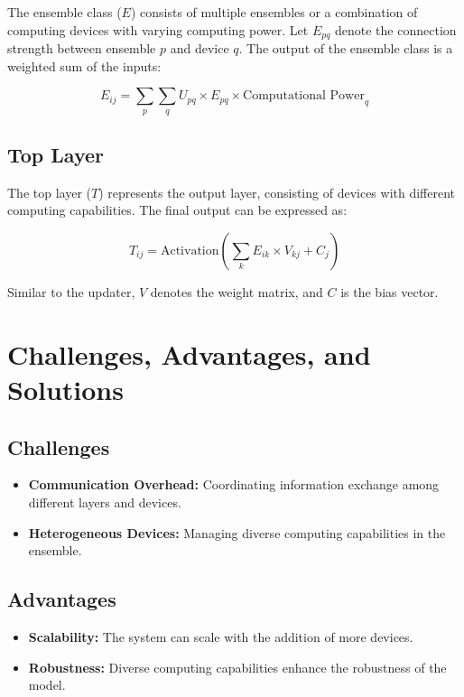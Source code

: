 \documentclass{article}
\begin{document}
The ensemble class ($E$) consists of multiple ensembles or a combination of computing devices with varying computing power. Let $E_{pq}$ denote the connection strength between ensemble $p$ and device $q$. The output of the ensemble class is a weighted sum of the inputs:

\[
E_{ij} = \sum_{p} \sum_{q} U_{pq} \times E_{pq} \times \text{Computational Power}_{q}
\]

\subsection{Top Layer}

The top layer ($T$) represents the output layer, consisting of devices with different computing capabilities. The final output can be expressed as:

\[
T_{ij} = \text{Activation}\left(\sum_{k} E_{ik} \times V_{kj} + C_j\right)
\]

Similar to the updater, $V$ denotes the weight matrix, and $C$ is the bias vector.

\section{Challenges, Advantages, and Solutions}

\subsection{Challenges}

\begin{itemize}
  \item \textbf{Communication Overhead:} Coordinating information exchange among different layers and devices.
  \item \textbf{Heterogeneous Devices:} Managing diverse computing capabilities in the ensemble.
\end{itemize}

\subsection{Advantages}

\begin{itemize}
  \item \textbf{Scalability:} The system can scale with the addition of more devices.
  \item \textbf{Robustness:} Diverse computing capabilities enhance the robustness of the model.
\end{itemize}
\end{document}
